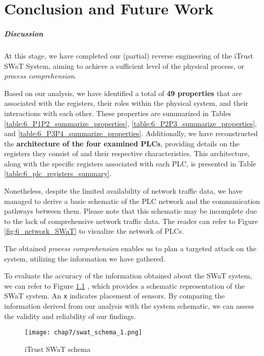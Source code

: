 \chapter{Conclusion and Future Work}
\label{conclusions}

\paragraph{Discussion}
\label{par:7_discussion}
At this stage, we have completed our (partial) reverse engineering of the iTrust SWaT System, aiming to achieve a sufficient level of the physical process, or \textit{process comprehension}. 

\bigskip
Based on our analysis, we have identified a total of \textbf{49 properties} that are associated with the registers, their roles within the physical system, and their interactions with each other. These properties are summarized in Tables \ref{table:6_P1P2_summarize_properties}, \ref{table:6_P2P3_summarize_properties}, and \ref{table:6_P3P4_summarize_properties}. Additionally, we have reconstructed the \textbf{architecture of the four examined PLCs}, providing details on the registers they consist of and their respective characteristics. This architecture, along with the specific registers associated with each PLC, is presented in Table \ref{table:6_plc_registers_summary}.

Nonetheless, despite the limited availability of network traffic data, we have managed to derive a basic schematic of the PLC network and the communication pathways between them. Please note that this schematic may be incomplete due to the lack of comprehensive network traffic data. The reader can refer to Figure \ref{fig:6_network_SWaT} to visualize the network of PLCs.

The obtained \textit{process comprehension} enables us to plan a targeted attack on the system, utilizing the information we have gathered.

\bigskip
To evaluate the accuracy of the information obtained about the SWaT system, we can refer to Figure \ref{fig:7_swat_schema} \cite{swat_tecnical_pdf}, which provides a schematic representation of the SWaT system. An \texttt{x} indicates placement of sensors. By comparing the information derived from our analysis with the system schematic, we can assess the validity and reliability of our findings.

\begin{figure}[ht]
	\centering
	\texttt{[image: chap7/swat\_schema\_1.png]}
	\caption{iTrust SWaT schema}
	\label{fig:7_swat_schema}
\end{figure}

